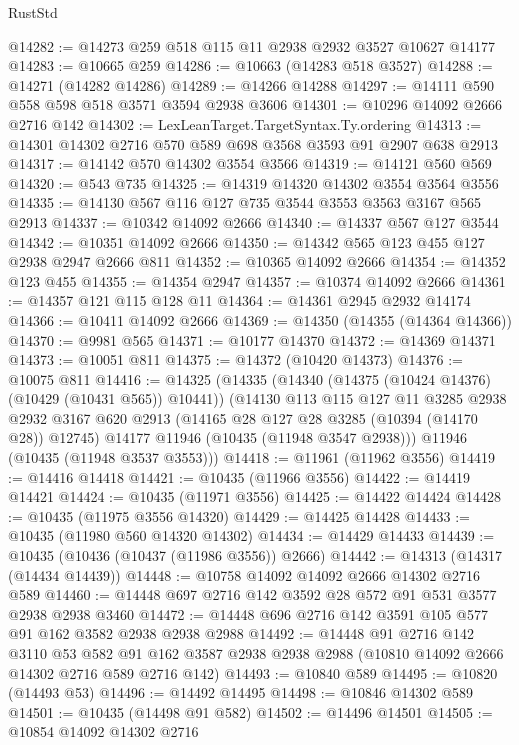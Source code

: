 \begin{lexlean}{RustStd}
\begin{coremodule}
{\begin{coremodule}
{{{{{{{{{{{{{{{{{{{{{{{{{{{{{{{{{{{{{{{{{{{{{{{{{{{{{{{{{{{{{{{{{{{{{{{{{{{{{{@14282 := @14273 @259 @518 @115 @11 @2938 @2932 @3527 @10627 @14177
@14283 := @10665 @259
@14286 := @10663 (@14283 @518 @3527)
@14288 := @14271 (@14282 @14286)
@14289 := @14266 @14288
@14297 := @14111 @590 @558 @598 @518 @3571 @3594 @2938 @3606
@14301 := @10296 @14092 @2666 @2716 @142
@14302 := LexLeanTarget.TargetSyntax.Ty.ordering
@14313 := @14301 @14302 @2716 @570 @589 @698 @3568 @3593 @91 @2907 @638 @2913
@14317 := @14142 @570 @14302 @3554 @3566
@14319 := @14121 @560 @569
@14320 := @543 @735
@14325 := @14319 @14320 @14302 @3554 @3564 @3556
@14335 := @14130 @567 @116 @127 @735 @3544 @3553 @3563 @3167 @565 @2913
@14337 := @10342 @14092 @2666
@14340 := @14337 @567 @127 @3544
@14342 := @10351 @14092 @2666
@14350 := @14342 @565 @123 @455 @127 @2938 @2947 @2666 @811
@14352 := @10365 @14092 @2666
@14354 := @14352 @123 @455
@14355 := @14354 @2947
@14357 := @10374 @14092 @2666
@14361 := @14357 @121 @115 @128 @11
@14364 := @14361 @2945 @2932 @14174
@14366 := @10411 @14092 @2666
@14369 := @14350 (@14355 (@14364 @14366))
@14370 := @9981 @565
@14371 := @10177 @14370
@14372 := @14369 @14371
@14373 := @10051 @811
@14375 := @14372 (@10420 @14373)
@14376 := @10075 @811
@14416 := @14325
    (@14335
      (@14340 (@14375 (@10424 @14376) (@10429 (@10431 @565)) @10441))
      (@14130
        @113
        @115
        @127
        @11
        @3285
        @2938
        @2932
        @3167
        @620
        @2913
        (@14165 @28 @127 @28 @3285 (@10394 (@14170 @28)) @12745)
        @14177
        @11946
        (@10435 (@11948 @3547 @2938)))
      @11946
      (@10435 (@11948 @3537 @3553)))
@14418 := @11961 (@11962 @3556)
@14419 := @14416 @14418
@14421 := @10435 (@11966 @3556)
@14422 := @14419 @14421
@14424 := @10435 (@11971 @3556)
@14425 := @14422 @14424
@14428 := @10435 (@11975 @3556 @14320)
@14429 := @14425 @14428
@14433 := @10435 (@11980 @560 @14320 @14302)
@14434 := @14429 @14433
@14439 := @10435 (@10436 (@10437 (@11986 @3556)) @2666)
@14442 := @14313 (@14317 (@14434 @14439))
@14448 := @10758 @14092 @14092 @2666 @14302 @2716 @589
@14460 := @14448 @697 @2716 @142 @3592 @28 @572 @91 @531 @3577 @2938 @2938 @3460
@14472 := @14448 @696 @2716 @142 @3591 @105 @577 @91 @162 @3582 @2938 @2938 @2988
@14492 := @14448
    @91
    @2716
    @142
    @3110
    @53
    @582
    @91
    @162
    @3587
    @2938
    @2938
    @2988
    (@10810 @14092 @2666 @14302 @2716 @589 @2716 @142)
@14493 := @10840 @589
@14495 := @10820 (@14493 @53)
@14496 := @14492 @14495
@14498 := @10846 @14302 @589
@14501 := @10435 (@14498 @91 @582)
@14502 := @14496 @14501
@14505 := @10854 @14092 @14302 @2716
}}}}}}}}}}}}}}}}}}}}}}}}}}}}}}}}}}}}}}}}}}}}}}}}}}}}}}}}}}}}}}}}}}}}}}}}}}}}}}
\end{coremodule}}
\end{coremodule}
\end{lexlean}
